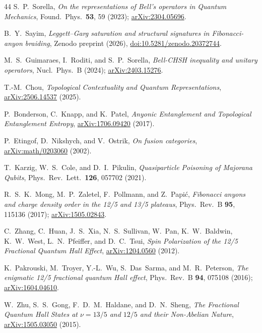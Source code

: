 \documentclass[aps,pra,twocolumn,superscriptaddress,longbibliography,floatfix,nofootinbib]{revtex4-2}
\begin{document}
\begin{thebibliography}{44}
S.~P.~Sorella,
\textit{On the representations of Bell's operators in Quantum Mechanics},
Found.\ Phys.\ \textbf{53}, 59 (2023);
\href{https://arxiv.org/abs/2304.05696}{arXiv:2304.05696}.

B.~Y.~Sayim,
\textit{Leggett--Garg saturation and structural signatures in Fibonacci-anyon braiding},
Zenodo preprint (2026),
\href{https://doi.org/10.5281/zenodo.20372744}{doi:10.5281/zenodo.20372744}.


M.~S.~Guimaraes, I.~Roditi, and S.~P.~Sorella,
\textit{Bell-CHSH inequality and unitary operators},
Nucl.\ Phys.\ B (2024);
\href{https://arxiv.org/abs/2403.15276}{arXiv:2403.15276}.

T.-M.~Chou,
\textit{Topological Contextuality and Quantum Representations},
\href{https://arxiv.org/abs/2506.14537}{arXiv:2506.14537} (2025).

P.~Bonderson, C.~Knapp, and K.~Patel,
\textit{Anyonic Entanglement and Topological Entanglement Entropy},
\href{https://arxiv.org/abs/1706.09420}{arXiv:1706.09420} (2017).

P.~Etingof, D.~Nikshych, and V.~Ostrik,
\textit{On fusion categories},
\href{https://arxiv.org/abs/math/0203060}{arXiv:math/0203060} (2002).

T.~Karzig, W.~S.~Cole, and D.~I.~Pikulin,
\textit{Quasiparticle Poisoning of Majorana Qubits},
Phys.\ Rev.\ Lett.\ \textbf{126}, 057702 (2021).

R.~S.~K.~Mong, M.~P.~Zaletel, F.~Pollmann, and Z.~Papi\'{c},
\textit{Fibonacci anyons and charge density order in the 12/5 and 13/5 plateaus},
Phys.\ Rev.\ B \textbf{95}, 115136 (2017);
\href{https://arxiv.org/abs/1505.02843}{arXiv:1505.02843}.

C.~Zhang, C.~Huan, J.~S.~Xia, N.~S.~Sullivan, W.~Pan, K.~W.~Baldwin, K.~W.~West, L.~N.~Pfeiffer, and D.~C.~Tsui,
\textit{Spin Polarization of the 12/5 Fractional Quantum Hall Effect},
\href{https://arxiv.org/abs/1204.0560}{arXiv:1204.0560} (2012).

K.~Pakrouski, M.~Troyer, Y.-L.~Wu, S.~Das~Sarma, and M.~R.~Peterson,
\textit{The enigmatic 12/5 fractional quantum Hall effect},
Phys.\ Rev.\ B \textbf{94}, 075108 (2016);
\href{https://arxiv.org/abs/1604.04610}{arXiv:1604.04610}.

W.~Zhu, S.~S.~Gong, F.~D.~M.~Haldane, and D.~N.~Sheng,
\textit{The Fractional Quantum Hall States at $\nu=13/5$ and $12/5$ and their Non-Abelian Nature},
\href{https://arxiv.org/abs/1505.03050}{arXiv:1505.03050} (2015).


\end{thebibliography}
\end{document}
